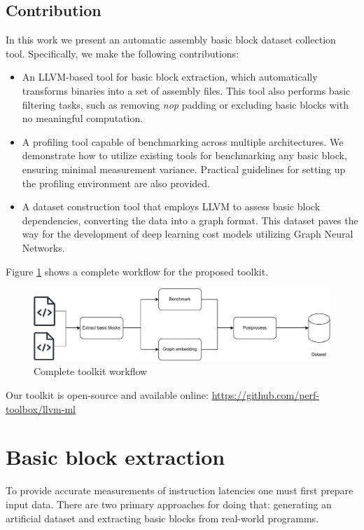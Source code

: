 \subsection{Contribution}

In this work we present an automatic assembly basic block dataset collection tool. Specifically, we make 
the following contributions:
\begin{itemize}
	\item An LLVM-based tool for basic block extraction, which automatically transforms binaries into a set 
        of assembly files. This tool also performs basic filtering tasks, such as removing \textit{nop} 
        padding or excluding basic blocks with no meaningful computation.
	\item A profiling tool capable of benchmarking across multiple architectures. We demonstrate how to utilize
        existing tools for benchmarking any basic block, ensuring minimal measurement variance. Practical 
        guidelines for setting up the profiling environment are also provided.
	\item A dataset construction tool that employs LLVM to assess basic block dependencies, converting the 
        data into a graph format. This dataset paves the way for the development of deep learning cost 
        models utilizing Graph Neural Networks.
\end{itemize}

Figure \ref{fig:workflow} shows a complete workflow for the proposed toolkit.

\begin{figure}[h]
  \caption{Complete toolkit workflow}
  \centering
  \label{fig:workflow}
  \includegraphics[width=0.8\linewidth]{workflow}
\end{figure}

Our toolkit is open-source and available online: \url{https://github.com/perf-toolbox/llvm-ml}

\section{Basic block extraction}

To provide accurate measurements of instruction latencies one must first prepare input data. There are 
two primary approaches for doing that: generating an artificial dataset and extracting basic blocks from
real-world programms.

